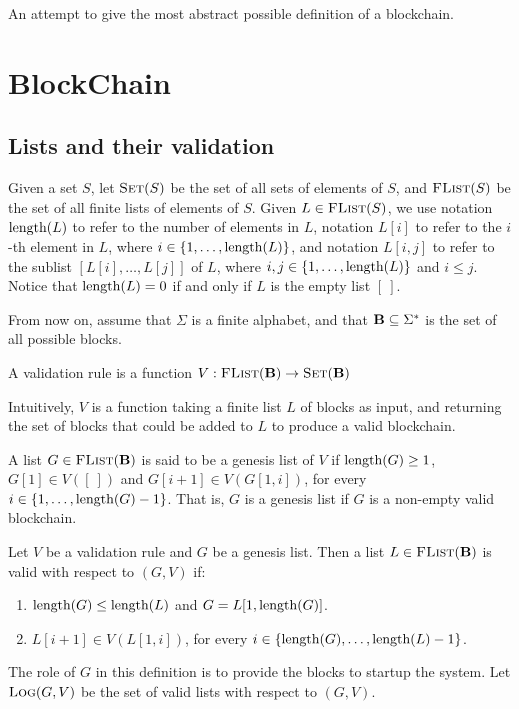 
An attempt to give the most abstract possible definition of a blockchain.

\section{BlockChain}

\subsection{Lists and their validation}

Given a set $S$, let $\text{\sc Set}(S)$ be the set of all sets of elements of $S$, and $\text{\sc FList}(S)$ be the set of all finite lists of elements of $S$. Given $L \in \text{\sc FList}(S)$, we use notation $\text{\rm length}(L)$ to refer to the number of elements in $L$, notation $L[i]$ to refer to the $i$-th element in $L$, where $i \in \{1, \ldots, \text{\rm length}(L)\}$, and notation $L[i,j]$ to refer to the sublist $[L[i], \ldots, L[j]]$ of $L$, where $i,j \in \{1, \ldots, \text{\rm length}(L)\}$ and $i \leq j$. Notice that $\text{\rm length}(L) = 0$ if and only if $L$ is the empty list $[\ ]$. 

From now on, assume that $\Sigma$ is a finite alphabet, and that $\text{\bf B} \subseteq \Sigma^*$ is the set of all possible blocks.  

\begin{mydef}
A validation rule is a function $V : \text{\sc FList}(\text{\bf B}) \to \text{\sc Set}(\text{\bf B})$
\end{mydef}
Intuitively, $V$ is a function taking a finite list $L$ of blocks as input, and returning the set of blocks that could be added to $L$ to produce a valid blockchain.

A list $G \in \text{\sc FList}(\text{\bf B})$  is said to be a genesis list of $V$ if $\text{\rm length}(G) \geq 1$, $G[1] \in V([\ ])$ and $G[i+1] \in V(G[1,i])$, for every $i \in \{1, \ldots, \text{\rm length}(G)-1\}$. That is, $G$ is a genesis list if $G$ is a non-empty valid blockchain. 
\begin{mydef}
Let $V$ be a validation rule and $G$ be a genesis list. Then a list $L \in \text{\sc FList}(\text{\bf B})$ is valid with respect to $(G,V)$ if:
\begin{enumerate}
\item $\text{\rm length}(G) \leq \text{\rm length}(L)$ and $G = L[1,\text{\rm length}(G)]$.

\item $L[i+1] \in V(L[1,i])$, for every $i \in \{\text{\rm length}(G), \ldots, \text{\rm length}(L)-1\}$.
\end{enumerate}
\end{mydef}
The role of $G$ in this definition is to provide the blocks to startup the system. Let $\text{\sc Log}(G,V)$ be the set of valid lists with respect to $(G,V)$.

